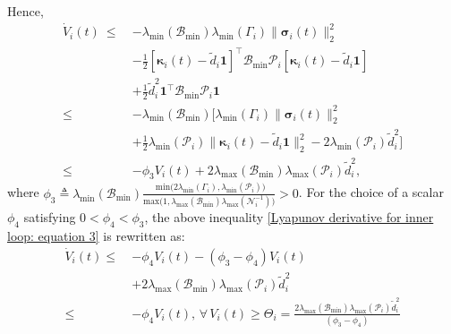 \documentclass[lettersize,journal]{IEEEtran}
\begin{document}
Hence,
\begin{align}
\label{Lyapunov derivative for inner loop: equation 3}
\dot{V}_i(t) ~ \leq ~ &-\lambda_{\text{min}}(\mathcal{B}_{\text{min}})\lambda_{\text{min}}(\Gamma_i) \lVert \boldsymbol{\sigma}_i(t) \rVert_2^2 \nonumber\\
& - \frac{1}{2}\left[\boldsymbol{\kappa}_i(t) - \tilde{d}_{i} \boldsymbol{1}\right]^{\top} \mathcal{B}_{\text{min}} \mathcal{P}_{i} \left[\boldsymbol{\kappa}_i(t) - \tilde{d}_{i} \boldsymbol{1}\right] \nonumber\\
& +\frac{1}{2}\tilde{d}_{i}^2 \boldsymbol{1}^{\top} \mathcal{B}_{\text{min}} \mathcal{P}_{i} \boldsymbol{1} \nonumber \\
\leq ~ &-\lambda_{\text{min}}(\mathcal{B}_{\text{min}}) \Big[ \lambda_{\text{min}}(\Gamma_i) \lVert \boldsymbol{\sigma}_i(t) \rVert_2^2 \nonumber\\
& + \frac{1}{2}\lambda_{\text{min}}(\mathcal{P}_{i}) \lVert \boldsymbol{\kappa}_i(t) - \tilde{d}_{i} \boldsymbol{1} \rVert_2^2  - 2 \lambda_{\text{min}}(\mathcal{P}_{i}) \tilde{d}_{i}^2 \Big] \nonumber \\
\leq~ &-\phi_3 V_i(t) + 2 \lambda_{\text{max}}(\mathcal{B}_{\text{min}}) \lambda_{\text{max}}(\mathcal{P}_{i}) \tilde{d}_{i}^2,
\end{align}
where $\phi_3 \triangleq \lambda_{\text{min}}\left(\mathcal{B}_{\text{min}} \right) \frac{\text{ min}\big(2 \lambda_{\text{min}}\left(\Gamma_i \right),\lambda_{\text{min}}\left(\mathcal{P}_i \right)\big)}{\text{max}\big(1,\lambda_{\text{max}}\left(\mathcal{B}_{\text{min}} \right) \lambda_{\text{max}}\left(\mathcal{N}_i^{-1} \right)\big)}>0$.
For the choice of a scalar $\phi_4$ satisfying $0<\phi_4<\phi_3$, the above inequality \eqref{Lyapunov derivative for inner loop: equation 3} is rewritten as:
\begin{align}
\label{Lyapunov derivative for inner loop: equation 4}
\dot{V}_i(t)\leq~&-\phi_4 V_i(t)-(\phi_3-\phi_4) V_i(t) \nonumber \\
& + 2 \lambda_{\text{max}}(\mathcal{B}_{\text{min}}) \lambda_{\text{max}}(\mathcal{P}_{i}) \tilde{d}_{i}^2 \nonumber\\
\leq ~&-\phi_4 V_i(t), \, \forall\, V_i(t)\geq \Theta_i=\frac{2 \lambda_{\text{max}}(\mathcal{B}_{\text{min}}) \lambda_{\text{max}}(\mathcal{P}_{i}) \tilde{d}_{i}^2}{(\phi_3-\phi_4)}
\end{align}
\end{document}
